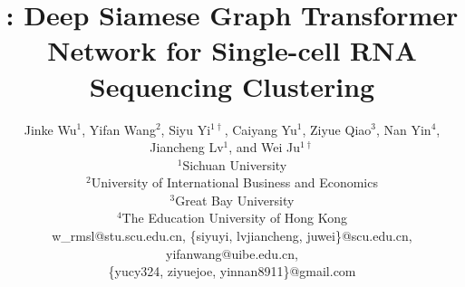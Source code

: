 






\title{\method{}: Deep Siamese Graph Transformer Network for Single-cell RNA Sequencing Clustering}

\author{
Jinke Wu$^{1}$,
Yifan Wang$^{2}$,
Siyu Yi$^{1\dagger}$,
Caiyang Yu$^{1}$,
Ziyue Qiao$^{3}$,
Nan Yin$^{4}$,\\
Jiancheng Lv$^{1}$, {\normalfont and}
Wei Ju$^{1\dagger}$
\\
{\normalfont
$^{1}$Sichuan University\\
$^{2}$University of International Business and Economics\\
$^{3}$Great Bay University\\
$^{4}$The Education University of Hong Kong\\
w\_rmsl@stu.scu.edu.cn,
\{siyuyi, lvjiancheng, juwei\}@scu.edu.cn,
yifanwang@uibe.edu.cn,\\
\{yucy324, ziyuejoe, yinnan8911\}@gmail.com
}
}


\maketitle
\renewcommand{\thefootnote}{\fnsymbol{footnote}}
\renewcommand{\thefootnote}{\arabic{footnote}}
\setcounter{footnote}{0}







